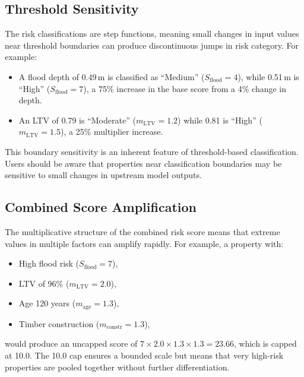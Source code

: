 \documentclass[11pt,a4paper]{article}
\begin{document}


\subsection{Threshold Sensitivity}

The risk classifications are step functions, meaning small changes in input values near threshold boundaries can produce discontinuous jumps in risk category. For example:

\begin{itemize}
    \item A flood depth of 0.49\,m is classified as ``Medium'' ($S_{\text{flood}} = 4$), while 0.51\,m is ``High'' ($S_{\text{flood}} = 7$), a 75\% increase in the base score from a 4\% change in depth.
    \item An LTV of 0.79 is ``Moderate'' ($m_{\text{LTV}} = 1.2$) while 0.81 is ``High'' ($m_{\text{LTV}} = 1.5$), a 25\% multiplier increase.
\end{itemize}

\noindent This boundary sensitivity is an inherent feature of threshold-based classification. Users should be aware that properties near classification boundaries may be sensitive to small changes in upstream model outputs.

\subsection{Combined Score Amplification}

The multiplicative structure of the combined risk score means that extreme values in multiple factors can amplify rapidly. For example, a property with:

\begin{itemize}
    \item High flood risk ($S_{\text{flood}} = 7$),
    \item LTV of 96\% ($m_{\text{LTV}} = 2.0$),
    \item Age 120 years ($m_{\text{age}} = 1.3$),
    \item Timber construction ($m_{\text{constr}} = 1.3$),
\end{itemize}

\noindent would produce an uncapped score of $7 \times 2.0 \times 1.3 \times 1.3 = 23.66$, which is capped at 10.0. The 10.0 cap ensures a bounded scale but means that very high-risk properties are pooled together without further differentiation.
\end{document}
